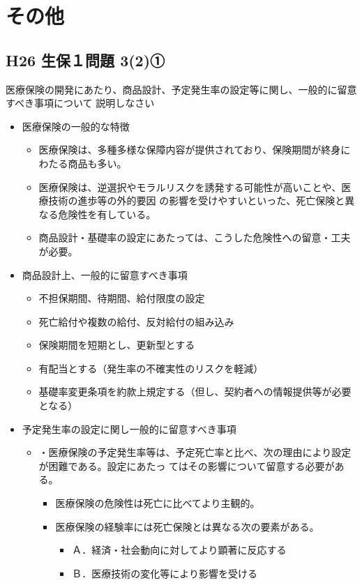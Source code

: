 \documentclass[report,gutter=10mm,fore-edge=10mm,uplatex,dvipdfmx]{jlreq}
\begin{document}
\section{その他}
\subsection{H26 生保１問題 3(2)①}
医療保険の開発にあたり、商品設計、予定発生率の設定等に関し、一般的に留意すべき事項について
説明しなさい
\begin{itemize}
 \item 医療保険の一般的な特徴
\begin{itemize}
 \item 医療保険は、多種多様な保障内容が提供されており、保険期間が終身にわたる商品も多い。
 \item 医療保険は、逆選択やモラルリスクを誘発する可能性が高いことや、医療技術の進歩等の外的要因
の影響を受けやすいといった、死亡保険と異なる危険性を有している。
 \item 商品設計・基礎率の設定にあたっては、こうした危険性への留意・工夫が必要。
\end{itemize}
 \item 商品設計上、一般的に留意すべき事項
\begin{itemize}
 \item 不担保期間、待期間、給付限度の設定
 \item 死亡給付や複数の給付、反対給付の組み込み
 \item 保険期間を短期とし、更新型とする
 \item 有配当とする（発生率の不確実性のリスクを軽減）
 \item 基礎率変更条項を約款上規定する（但し、契約者への情報提供等が必要となる）
\end{itemize}
 \item 予定発生率の設定に関し一般的に留意すべき事項
\begin{itemize}
 \item 
・医療保険の予定発生率等は、予定死亡率と比べ、次の理由により設定が困難である。設定にあたっ
てはその影響について留意する必要がある。
\begin{itemize}
 \item 医療保険の危険性は死亡に比べてより主観的。
 \item  医療保険の経験率には死亡保険とは異なる次の要素がある。
\begin{itemize}
 \item Ａ．経済・社会動向に対してより顕著に反応する
 \item Ｂ．医療技術の変化等により影響を受ける

\end{itemize}
\end{itemize}
\end{itemize}
\end{itemize}
\end{document}
